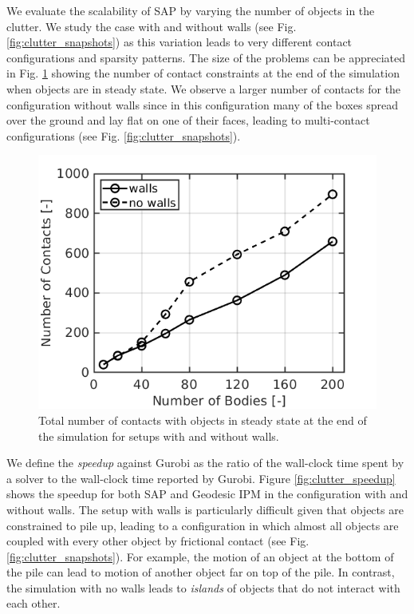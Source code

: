 We evaluate the scalability of SAP by varying the number of objects in the
clutter. We study the case with and without walls (see Fig.
\ref{fig:clutter_snapshots}) as this variation leads to very different contact
configurations and sparsity patterns. The size of the problems can be
appreciated in Fig. \ref{fig:clutter_num_contats} showing the number of contact
constraints at the end of the simulation when objects are in steady state. We
observe a larger number of contacts for the configuration without walls since in
this configuration many of the boxes spread over the ground and lay flat on one
of their faces, leading to multi-contact configurations (see Fig.
\ref{fig:clutter_snapshots}).
\begin{figure}[!h]
	\centering
	\includegraphics[width=0.7\columnwidth]{figures/clutter/number_of_contacts.png}
	\caption{\label{fig:clutter_num_contats} 
	Total number of contacts with objects in steady state at the end of the
	simulation for setups with and without walls.}
\end{figure}

We define the \emph{speedup} against Gurobi as the ratio of the wall-clock time
spent by a solver to the wall-clock time reported by Gurobi. Figure
\ref{fig:clutter_speedup} shows the speedup for both SAP and Geodesic IPM in the
configuration with and without walls. The setup with walls is particularly
difficult given that objects are constrained to pile up, leading to a
configuration in which almost all objects are coupled with every other object by
frictional contact (see Fig. \ref{fig:clutter_snapshots}). For example, the motion
of an object at the bottom of the pile can lead to motion of another object far
on top of the pile. In contrast, the simulation with no walls leads to
\emph{islands} of objects that do not interact with each other.

